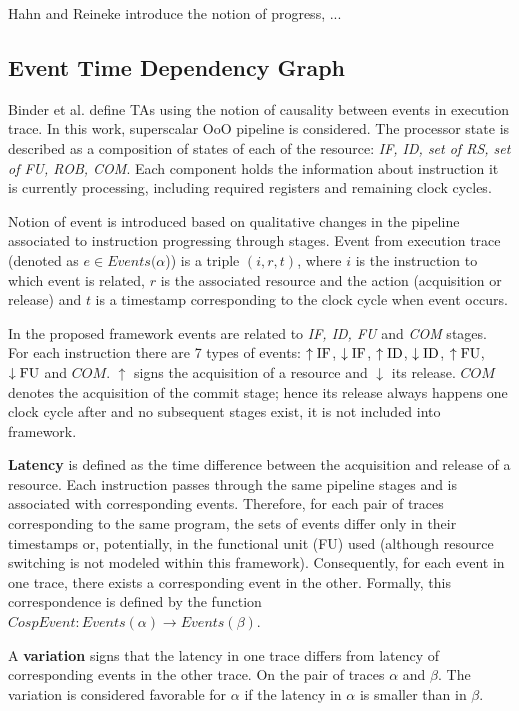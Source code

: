 Hahn and Reineke \cite{hahn_design_2020} introduce the notion of progress, ... \cite{gruin_minotaur_2023}

\subsection{Event Time Dependency Graph}

Binder et al. \cite{binder_definitions_2022} define TAs using the notion of causality between events in execution trace. In this work, superscalar OoO pipeline is considered. The processor state is described as a composition of states of each of the resource: \textit{IF, ID, set of RS, set of FU, ROB, COM}. Each component holds the information about instruction it is currently processing, including required registers and remaining clock cycles.

Notion of event is introduced based on qualitative changes in the pipeline associated to instruction progressing through stages. Event from execution trace (denoted as $e \in Events(\alpha$)) is a triple $(i,r,t)$, where $i$ is the instruction to which event is related, $r$ is the associated resource and the action (acquisition or release) and $t$ is a timestamp corresponding to the clock cycle when event occurs.

In the proposed framework events are related to \textit{IF, ID, FU} and \textit{COM} stages. For each instruction there are 7 types of events: $\uparrow\mathrm{IF}$, $\downarrow\mathrm{IF}$, $\uparrow\mathrm{ID}$, $\downarrow\mathrm{ID}$, $\uparrow\mathrm{FU}$, $\downarrow\mathrm{FU}$ and $COM$. $\uparrow$ signs the acquisition of a resource and $\downarrow$ its release. $COM$ denotes the acquisition of the commit stage; hence its release always happens one clock cycle after and no subsequent stages exist, it is not included into framework.

\textbf{Latency} is defined as the time difference between the acquisition and release of a resource. Each instruction passes through the same pipeline stages and is associated with corresponding events. Therefore, for each pair of traces corresponding to the same program, the sets of events differ only in their timestamps or, potentially, in the functional unit (FU) used (although resource switching is not modeled within this framework). Consequently, for each event in one trace, there exists a corresponding event in the other. Formally, this correspondence is defined by the function $CospEvent: Events(\alpha) \rightarrow Events(\beta)$.


A \textbf{variation} signs that the latency in one trace differs from latency of corresponding events in the other trace. On the pair of traces $\alpha$ and $\beta$. The variation is considered favorable for $\alpha$ if the latency in $\alpha$ is smaller than in $\beta$.

